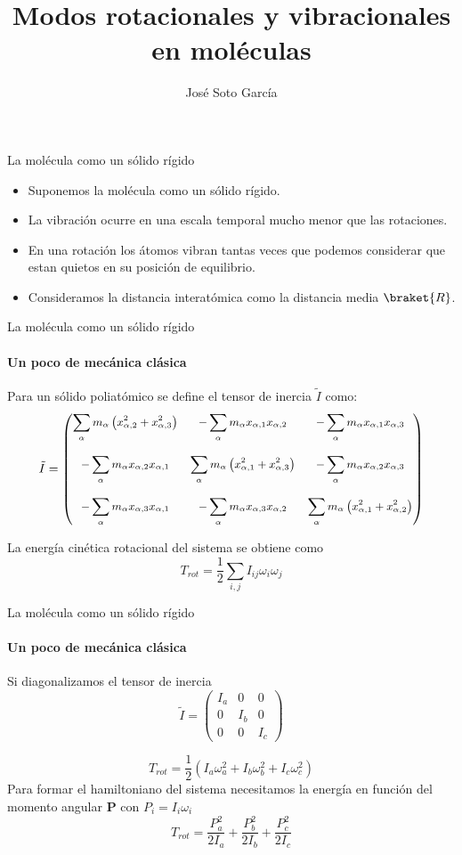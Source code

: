 \documentclass[a4paper]{beamer}
\title{Modos rotacionales y vibracionales en moléculas}
\author{José Soto García}
\begin{document}
\maketitle
\begin{frame}{La molécula como un sólido rígido}
\begin{itemize}
\item Suponemos la molécula como un sólido rígido.
\item La vibración ocurre en una escala temporal mucho menor que las rotaciones.
\item En una rotación los átomos vibran tantas veces que podemos considerar que estan quietos en su posición de equilibrio.
\item Consideramos la distancia interatómica como la distancia media $\braket{R}$.	
\end{itemize}
\end{frame}
\begin{frame}{La molécula como un sólido rígido}
\framesubtitle{Un poco de mecánica clásica}
  Para un sólido poliatómico se define el tensor de inercia $\tilde I$ como:
  \[\small{
\tilde{I}=\begin{pmatrix}
\displaystyle\sum_{\alpha}m_{\alpha}\left(x^2_{\alpha,2}+x^2_{\alpha,3}\right) & -\displaystyle\sum_{\alpha}m_{\alpha}x_{\alpha,1}x_{\alpha,2} & -\displaystyle\sum_{\alpha}m_{\alpha}x_{\alpha,1}x_{\alpha,3} \\\\
-\displaystyle\sum_{\alpha}m_{\alpha}x_{\alpha,2}x_{\alpha,1} & \displaystyle\sum_{\alpha}m_{\alpha}\left(x^2_{\alpha,1}+x^2_{\alpha,3}\right) &-\displaystyle\sum_{\alpha}m_{\alpha}x_{\alpha,2}x_{\alpha,3} \\\\
-\displaystyle\sum_{\alpha}m_{\alpha}x_{\alpha,3}x_{\alpha,1} & -\displaystyle\sum_{\alpha}m_{\alpha}x_{\alpha,3}x_{\alpha,2} & \displaystyle\sum_{\alpha}m_{\alpha}\left(x^2_{\alpha,1}+x^2_{\alpha,2}\right) \end{pmatrix}}
\]

La energía cinética rotacional del sistema se obtiene como
$$T_{rot}=\frac{1}{2}\sum_{i,j}I_{ij}\omega_i\omega_j$$

\end{frame}

\begin{frame}{La molécula como un sólido rígido}
\framesubtitle{Un poco de mecánica clásica}
Si diagonalizamos el tensor de inercia
$$\tilde I = \begin{pmatrix}
I_a & 0 & 0\\
0 & I_b & 0\\
0 & 0 & I_c
\end{pmatrix}$$

$$T_{rot}=\frac{1}{2}\left(I_a\omega^2_a + I_b\omega^2_b + I_c\omega^2_c\right)$$
 Para formar el hamiltoniano del sistema necesitamos la energía en función del momento angular $\boldsymbol P$ con $P_i=I_i\omega_i$ 
 $$T_{rot}=\frac{P_a^2}{2I_a}+\frac{P_b^2}{2I_b}+\frac{P_c^2}{2I_c}$$
\end{frame}
\end{document}
